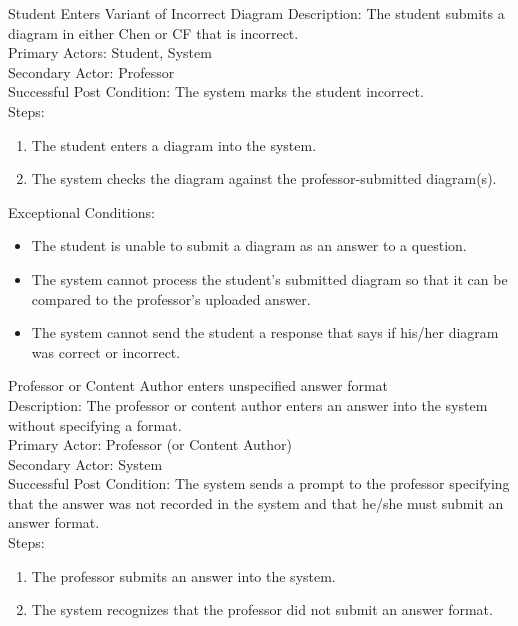     \begin{section}{Student Enters Variant of Incorrect Diagram}
        Description: The student submits a diagram in either Chen or CF that is incorrect.\\
        Primary Actors: Student, System \\
        Secondary Actor: Professor\\
        Successful Post Condition: The system marks the student incorrect. \\
        Steps:	
        \begin{enumerate}
            \item The student enters a diagram into the system.
            \item The system checks the diagram against the professor-submitted diagram(s).
        \end{enumerate}
        Exceptional Conditions:
        \begin{itemize}
            \item The student is unable to submit a diagram as an answer to a question.
            \item The system cannot process the student’s submitted diagram so that it can be compared to the professor’s uploaded answer.
            \item The system cannot send the student a response that says if his/her diagram was correct or incorrect.
        \end{itemize}
    \end{section}
    
    \begin{section}{Professor or Content}
        Author enters unspecified answer format\\
        Description: The professor or content author enters an answer into the system without specifying a format.\\
        Primary Actor: Professor (or Content Author)\\
        Secondary Actor: System\\
        Successful Post Condition: The system sends a prompt to the professor specifying that the answer was not recorded in the system and that he/she must submit an answer format. \\
        Steps:	
        \begin{enumerate}
            \item The professor submits an answer into the system.	
            \item The system recognizes that the professor did not submit an answer format.
        \end{enumerate}
    \end{section}
    
